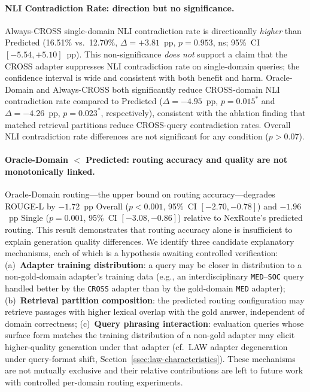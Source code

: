 \documentclass[a4paper,fleql,doubleblind]{cas-sc}
\begin{document}
\paragraph{NLI Contradiction Rate: direction but no significance.}
Always-CROSS single-domain NLI contradiction rate is directionally \emph{higher}
than Predicted (16.51\% vs.\ 12.70\%, $\Delta{=}{+}3.81$~pp,
$p{=}0.953$, \textsf{ns}; 95\%~CI $[-5.54,{+}5.10]$~pp).
This non-significance \emph{does not} support a claim that the CROSS adapter
suppresses NLI contradiction rate on single-domain queries; the confidence interval
is wide and consistent with both benefit and harm.
Oracle-Domain and Always-CROSS both significantly reduce CROSS-domain
NLI contradiction rate compared to Predicted ($\Delta{=}{-}4.95$~pp, $p{=}0.015^{*}$
and $\Delta{=}{-}4.26$~pp, $p{=}0.023^{*}$, respectively),
consistent with the ablation finding that matched retrieval partitions
reduce CROSS-query contradiction rates.
Overall NLI contradiction rate differences are not significant for any condition
($p{>}0.07$).

\paragraph{Oracle-Domain $<$ Predicted: routing accuracy and quality are not monotonically linked.}
Oracle-Domain routing---the upper bound on routing accuracy---degrades ROUGE-L
by $-1.72$~pp Overall ($p{<}0.001$, 95\%~CI $[-2.70,{-}0.78]$) and $-1.96$~pp
Single ($p{=}0.001$, 95\%~CI $[-3.08,{-}0.86]$) relative to NexRoute's predicted routing.
This result demonstrates that routing accuracy alone is insufficient to explain
generation quality differences.
We identify three candidate explanatory mechanisms, each of which is a hypothesis
awaiting controlled verification:
(a)~\textbf{Adapter training distribution}: a query may be closer in distribution
to a non-gold-domain adapter's training data (e.g., an interdisciplinary
\texttt{MED}--\texttt{SOC} query handled better by the \texttt{CROSS} adapter
than by the gold-domain \texttt{MED} adapter);
(b)~\textbf{Retrieval partition composition}: the predicted routing configuration
may retrieve passages with higher lexical overlap with the gold answer, independent
of domain correctness;
(c)~\textbf{Query phrasing interaction}: evaluation queries whose surface form
matches the training distribution of a non-gold adapter may elicit higher-quality
generation under that adapter (cf.\ LAW adapter degeneration under query-format shift, Section~\ref{ssec:law-characteristics}).
These mechanisms are not mutually exclusive and their relative contributions are
left to future work with controlled per-domain routing experiments.
\end{document}
